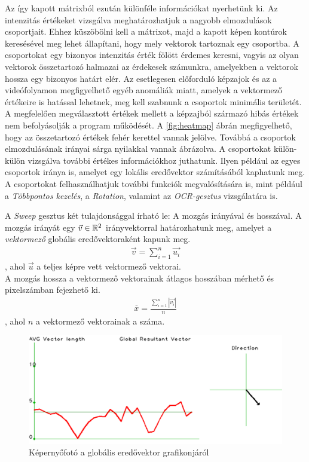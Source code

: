 Az így kapott mátrixból ezután különféle információkat nyerhetünk ki. Az intenzitás értékeket vizsgálva meghatározhatjuk a nagyobb elmozdulások csoportjait. Ehhez küszöbölni kell a mátrixot, majd a kapott képen kontúrok keresésével meg lehet állapítani, hogy mely vektorok tartoznak egy csoportba. A csoportokat egy bizonyos intenzitás érték fölött érdemes keresni, vagyis az olyan vektorok összetartozó halmazai az érdekesek számunkra, amelyekben a vektorok hossza egy bizonyos határt elér. Az esetlegesen előforduló képzajok és az a videófolyamon megfigyelhető egyéb anomáliák miatt, amelyek a vektormező értékeire is hatással lehetnek, meg kell szabnunk a csoportok minimális területét. A megfelelően megválasztott értékek mellett a képzajból származó hibás értékek nem befolyásolják a program működését.
A \ref{fig:heatmap} ábrán megfigyelhető, hogy az összetartozó értékek fehér kerettel vannak jelölve. Továbbá a csoportok elmozdulásának irányai sárga nyilakkal vannak ábrázolva. A csoportokat külön-külön vizsgálva további értékes információkhoz juthatunk. Ilyen például az egyes csoportok iránya is, amelyet egy lokális eredővektor számításából kaphatunk meg. A csoportokat felhasználhatjuk további funkciók megvalósítására is, mint például a \textit{Többpontos kezelés}, a \textit{Rotation}, valamint az \textit{OCR-gesztus} vizsgálatára is.



A \textit{Sweep} gesztus két tulajdonsággal írható le: A mozgás irányával és hosszával. A mozgás irányát egy $\vec{v}\in\Bbb R^2$ irányvektorral határozhatunk meg, amelyet a \textit{vektormező} globális eredővektoraként kapunk meg.
\begin{align*}
  \vec{v} = \sum_{i=1}^n\vec{u_i}
\end{align*}
, ahol $\vec{u}$ a teljes képre vett vektormező vektorai.\\
A mozgás hossza a vektormező vektorainak átlagos hosszában mérhető és pixelszámban fejezhető ki.
\begin{align*}
  \overline{x}=\frac{\sum_{i=1}^n \left|\vec{v_i}\right|}{n}
\end{align*}
, ahol $n$ a vektormező vektorainak a száma.

\begin{figure}[h]
\centering
\includegraphics[width=11.86truecm, height=5truecm]{images/ResultantPlot_screenshot.png}
\caption{Képernyőfotó a globális eredővektor grafikonjáról}
\label{fig:resultantplot}
\end{figure}

